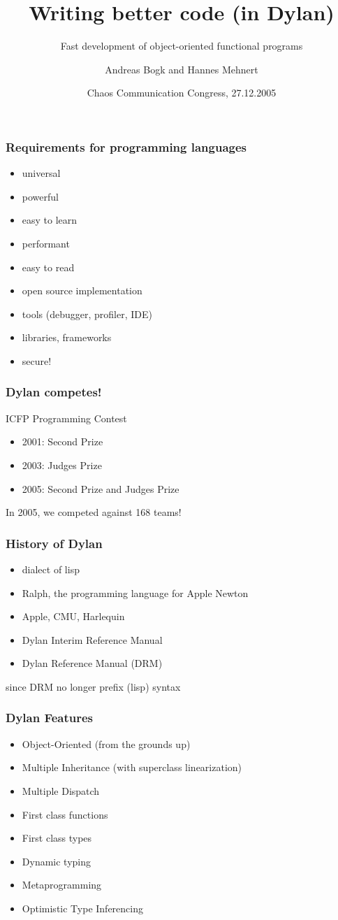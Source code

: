 \documentclass[compress]{beamer}
\title{Writing better code (in Dylan)}
\subtitle{Fast development of object-oriented functional programs}
\author{Andreas Bogk and Hannes Mehnert}
\begin{document}
\date{Chaos Communication Congress, 27.12.2005}
\frame{\titlepage}

\begin{frame}
  \frametitle{Requirements for programming languages}
  \begin{itemize}
  \item universal
  \item powerful
  \item easy to learn
  \item performant
  \item easy to read
  \item open source implementation
  \item tools (debugger, profiler, IDE)
  \item libraries, frameworks
  \item secure!
  \end{itemize}
\end{frame}

\begin{frame}
  \frametitle{Dylan competes!}
  ICFP Programming Contest
  \begin{itemize}
  \item 2001: Second Prize
  \item 2003: Judges Prize
  \item 2005: Second Prize and Judges Prize
  \end{itemize}
In 2005, we competed against 168 teams!
\end{frame}

\begin{frame}
  \frametitle{History of Dylan}
  \begin{itemize}
  \item dialect of lisp
  \item Ralph, the programming language for Apple Newton
  \item Apple, CMU, Harlequin
  \item Dylan Interim Reference Manual
  \item Dylan Reference Manual (DRM)
  \end{itemize}
  since DRM no longer prefix (lisp) syntax
\end{frame}

\begin{frame}
  \frametitle{Dylan Features}
  \begin{itemize}
  \item Object-Oriented (from the grounds up)
  \item Multiple Inheritance (with superclass linearization)
  \item Multiple Dispatch
  \item First class functions
  \item First class types
  \item Dynamic typing
  \item Metaprogramming
  \item Optimistic Type Inferencing
  \end{itemize}
\end{frame}
\end{document}

